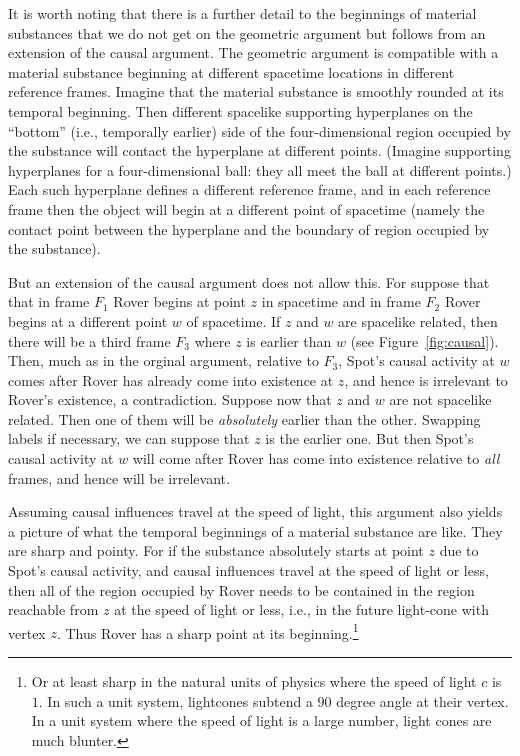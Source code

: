 It is worth noting that there is a further detail to the beginnings of material substances that we do not get on the 
geometric argument but follows from an extension of the causal argument. The geometric argument is compatible with a material substance 
beginning at different spacetime locations in different reference frames. Imagine that the material substance is smoothly 
rounded at its temporal beginning. Then different spacelike supporting hyperplanes on the ``bottom'' (i.e., temporally earlier) 
side of the four-dimensional region occupied by the substance will contact the hyperplane at different points. (Imagine supporting hyperplanes for 
a four-dimensional ball: they all meet the ball at different points.) Each such hyperplane defines a different reference frame,
and in each reference frame then the object will begin at a different point of spacetime (namely the contact point between 
the hyperplane and the boundary of region occupied by the substance). 

But an extension of the causal argument does not allow this. For suppose that that in frame $F_1$ Rover begins at 
point $z$ in spacetime and in frame $F_2$ Rover begins at a different point $w$ of spacetime. If $z$ and $w$ are spacelike 
related, then there will be a third frame $F_3$ where $z$ is earlier than $w$ (see Figure~\ref{fig:causal}). Then, much as in the orginal argument, 
relative to 
$F_3$, Spot's causal activity at $w$ comes after Rover has already come into existence at $z$, and hence is irrelevant to 
Rover's 
existence, a contradiction. Suppose now that $z$ and $w$ are not spacelike related. Then one of them will be \textit{absolutely}
earlier than the other. Swapping labels if necessary, we can suppose that $z$ is the earlier one. But then Spot's causal
activity at $w$ will come after Rover has come into existence relative to \textit{all} frames, and hence will be
irrelevant.

Assuming causal influences travel at the speed of light, this argument also yields a picture of what the temporal beginnings of 
a material substance are like. They are sharp and pointy. For if the substance absolutely starts at point $z$ due to Spot's 
causal activity, and causal influences travel at the speed of light or less, then all of the region occupied by Rover needs
to be contained in the region reachable from $z$ at the speed of light or less, i.e., in the future light-cone with vertex $z$.
Thus Rover has a sharp point at its beginning.\footnote{Or at least sharp in the natural units of physics where the speed of 
light $c$ is $1$. In such a unit system, lightcones subtend a $90$ degree angle at their vertex. In a unit system where the 
speed of light is a large number, light cones are much blunter.}

